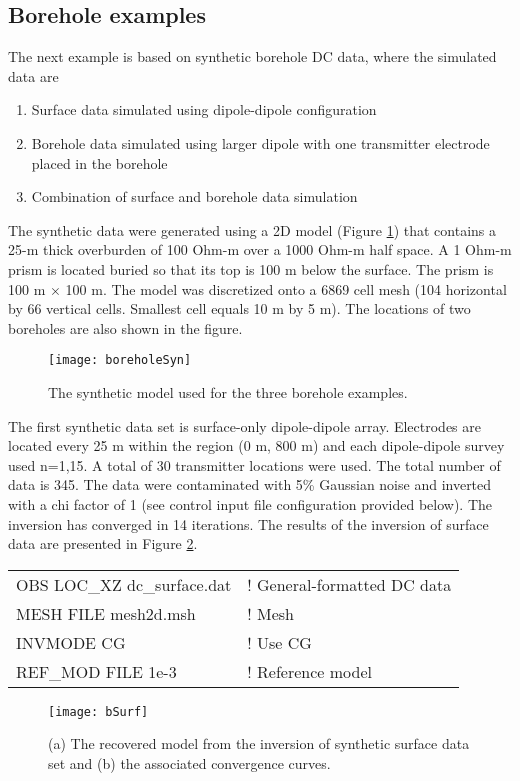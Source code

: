 \subsection{Borehole examples}
The next example is based on synthetic borehole DC data, where the simulated data are
%
\begin{enumerate}
\item Surface data simulated using dipole-dipole configuration
\item Borehole data simulated using larger dipole with one transmitter electrode placed in the borehole
\item Combination of surface and borehole data simulation
\end{enumerate}
The synthetic data were generated using a 2D model (Figure \ref{fig:boreholeSyn}) that contains a 25-m thick overburden of 100 Ohm-m over a 1000 Ohm-m half space. A 1 Ohm-m prism is located buried so that its top is 100 m below the surface. The prism is 100 m $\times$ 100 m. The model was discretized onto a 6869 cell mesh (104 horizontal by 66 vertical cells. Smallest cell equals 10 m by 5 m). The locations of two boreholes are also shown in the figure.
%
\begin{figure}
\centering
\texttt{[image: boreholeSyn]}
\caption{The synthetic model used for the three borehole examples.}
\label{fig:boreholeSyn}
\end{figure}

The first synthetic data set is surface-only dipole-dipole array. Electrodes are located every 25 m within the region (0 m, 800 m) and each dipole-dipole survey used n=1,15. A total of 30 transmitter locations were used. The total number of data is 345. The data were contaminated with 5\% Gaussian noise and inverted with a chi factor of 1 (see control input file configuration provided below). The inversion has converged in 14 iterations. The results of the inversion of surface data are presented in Figure \ref{fig:synBsurf}.
%
\begin{fileExample}
\begin{tabular}{|ll|}
\hline
OBS LOC\_XZ dc\_surface.dat & ! General-formatted DC data \\
MESH FILE mesh2d.msh & ! Mesh \\
INVMODE CG & ! Use CG \\
REF\_MOD FILE 1e-3 & ! Reference model \\
\hline
\end{tabular}
\end{fileExample}
%
\begin{figure}
\centering
\texttt{[image: bSurf]}
\caption{(a) The recovered model from the inversion of synthetic surface data set and (b) the associated convergence curves.}
\label{fig:synBsurf}
\end{figure}

